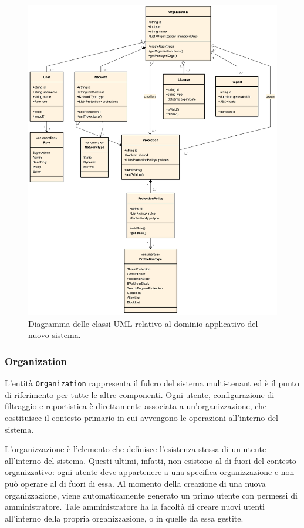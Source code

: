 \begin{figure}
  \centering
  \includegraphics[width=1\textwidth]{figures/domain-model.png}
  \caption{Diagramma delle classi UML relativo al dominio applicativo del nuovo sistema.}
  \label{fig:domain_model}
\end{figure}

\subsubsection{Organization}
L'entità \texttt{Organization} rappresenta il fulcro del sistema multi-tenant ed è il punto di riferimento per tutte le altre componenti. Ogni utente, configurazione di filtraggio e reportistica è direttamente associata a un'organizzazione, che costituisce il contesto primario in cui avvengono le operazioni all'interno del sistema.

L'organizzazione è l'elemento che definisce l'esistenza stessa di un utente all'interno del sistema. Questi ultimi, infatti, non esistono al di fuori del contesto organizzativo: ogni utente deve appartenere a una specifica organizzazione e non può operare al di fuori di essa. Al momento della creazione di una nuova organizzazione, viene automaticamente generato un primo utente con permessi di amministratore. Tale amministratore ha la facoltà di creare nuovi utenti all'interno della propria organizzazione, o in quelle da essa gestite.

